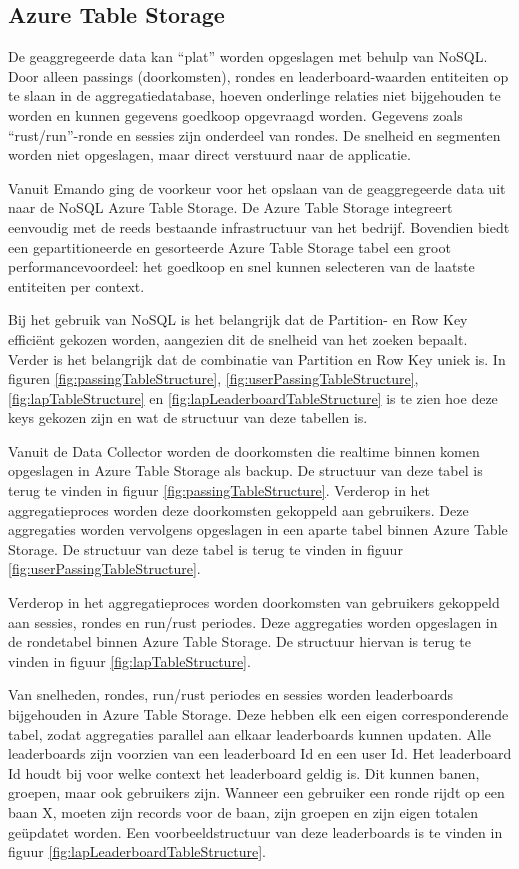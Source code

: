 \subsection{Azure Table Storage}
De geaggregeerde data kan ``plat'' worden opgeslagen met behulp van NoSQL. Door alleen passings (doorkomsten), rondes en leaderboard-waarden entiteiten op te slaan in de aggregatiedatabase, hoeven onderlinge relaties niet bijgehouden te worden en kunnen gegevens goedkoop opgevraagd worden. Gegevens zoals ``rust/run''-ronde en sessies zijn onderdeel van rondes. De snelheid en segmenten worden niet opgeslagen, maar direct verstuurd naar de applicatie.

Vanuit Emando ging de voorkeur voor het opslaan van de geaggregeerde data  uit naar de NoSQL Azure Table Storage. De Azure Table Storage integreert eenvoudig met de reeds bestaande infrastructuur van het bedrijf. Bovendien biedt een gepartitioneerde en gesorteerde Azure Table Storage tabel een groot performancevoordeel: het goedkoop en snel kunnen selecteren van de laatste entiteiten per context.

Bij het gebruik van NoSQL is het belangrijk dat de Partition- en Row Key efficiënt gekozen worden, aangezien dit de snelheid van het zoeken bepaalt. Verder is het belangrijk dat de combinatie van Partition en Row Key uniek is. In figuren \ref{fig:passingTableStructure}, \ref{fig:userPassingTableStructure}, \ref{fig:lapTableStructure} en \ref{fig:lapLeaderboardTableStructure} is te zien hoe deze keys gekozen zijn en wat de structuur van deze tabellen is.

Vanuit de Data Collector worden de doorkomsten die realtime binnen komen opgeslagen in Azure Table Storage als backup. De structuur van deze tabel is terug te vinden in figuur \ref{fig:passingTableStructure}. Verderop in het aggregatieproces worden deze doorkomsten gekoppeld aan gebruikers. Deze aggregaties worden vervolgens opgeslagen in een aparte tabel binnen Azure Table Storage. De structuur van deze tabel is terug te vinden in figuur \ref{fig:userPassingTableStructure}.

Verderop in het aggregatieproces worden doorkomsten van gebruikers gekoppeld aan sessies, rondes en run/rust periodes. Deze aggregaties worden opgeslagen in de rondetabel binnen Azure Table Storage. De structuur hiervan is terug te vinden in figuur \ref{fig:lapTableStructure}.

Van snelheden, rondes, run/rust periodes en sessies worden leaderboards bijgehouden in Azure Table Storage. Deze hebben elk een eigen corresponderende tabel, zodat aggregaties parallel aan elkaar leaderboards kunnen updaten.
Alle leaderboards zijn voorzien van een leaderboard Id en een user Id. Het leaderboard Id houdt bij voor welke context het leaderboard geldig is. Dit kunnen banen, groepen, maar ook gebruikers zijn. Wanneer een gebruiker een ronde rijdt op een baan X, moeten zijn records voor de baan, zijn groepen en zijn eigen totalen geüpdatet worden. Een voorbeeldstructuur van deze leaderboards is te vinden in figuur \ref{fig:lapLeaderboardTableStructure}.


